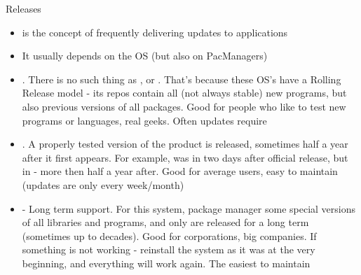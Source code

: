 \documentclass[usenames,dvipsnames,10pt,aspectratio=169]{beamer}
\begin{document}

\begin{frame}{Releases}
    \begin{itemize}
        \item {} is the concept of frequently delivering updates to applications
        \item It usually depends on the OS (but also on PacManagers)
        \item {}. There is no such thing as ,  or . That's because these OS's have a Rolling Release model - its repos contain all (not always stable) new programs, but also previous versions of all packages. Good for people who like to test new programs or languages, real geeks. Often updates require
        \item {}. A properly tested version of the product is released, sometimes half a year after it first appears. For example,  was in  two days after official release, but in  - more then half a year after. Good for average users, easy to maintain (updates are only every week/month)
        \item {} - Long term support. For this system, package manager  some special versions of all libraries and programs, and only  are released for a long term (sometimes up to decades). Good for corporations, big companies. If something is not working - reinstall the system as it was at the very beginning, and everything will work again. The easiest to maintain
    \end{itemize}
\end{frame}
\end{document}
